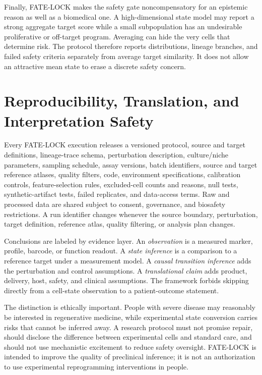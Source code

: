 \documentclass[10pt,conference]{IEEEtran}
\begin{document}
Finally, FATE-LOCK makes the safety gate noncompensatory for an epistemic reason as well as a biomedical one. A high-dimensional state model may report a strong aggregate target score while a small subpopulation has an undesirable proliferative or off-target program. Averaging can hide the very cells that determine risk. The protocol therefore reports distributions, lineage branches, and failed safety criteria separately from average target similarity. It does not allow an attractive mean state to erase a discrete safety concern.

\section{Reproducibility, Translation, and Interpretation Safety}
\label{sec:reproducibility}

Every FATE-LOCK execution releases a versioned protocol, source and target definitions, lineage-trace schema, perturbation description, culture/niche parameters, sampling schedule, assay versions, batch identifiers, source and target reference atlases, quality filters, code, environment specifications, calibration controls, feature-selection rules, excluded-cell counts and reasons, null tests, synthetic-artifact tests, failed replicates, and data-access terms. Raw and processed data are shared subject to consent, governance, and biosafety restrictions. A run identifier changes whenever the source boundary, perturbation, target definition, reference atlas, quality filtering, or analysis plan changes.

Conclusions are labeled by evidence layer. An \emph{observation} is a measured marker, profile, barcode, or function readout. A \emph{state inference} is a comparison to a reference target under a measurement model. A \emph{causal transition inference} adds the perturbation and control assumptions. A \emph{translational claim} adds product, delivery, host, safety, and clinical assumptions. The framework forbids skipping directly from a cell-state observation to a patient-outcome statement.

The distinction is ethically important. People with severe disease may reasonably be interested in regenerative medicine, while experimental state conversion carries risks that cannot be inferred away. A research protocol must not promise repair, should disclose the difference between experimental cells and standard care, and should not use mechanistic excitement to reduce safety oversight. FATE-LOCK is intended to improve the quality of preclinical inference; it is not an authorization to use experimental reprogramming interventions in people.
\end{document}
